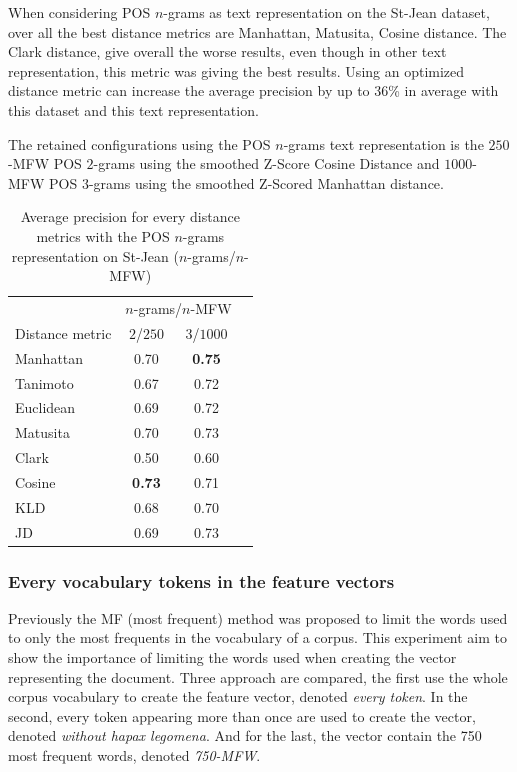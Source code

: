 When considering POS $n$-grams as text representation on the St-Jean dataset, over all the best distance metrics are Manhattan, Matusita, Cosine distance.
The Clark distance, give overall the worse results, even though in other text representation, this metric was giving the best results.
Using an optimized distance metric can increase the average precision by up to $36$\% in average with this dataset and this text representation.

The retained configurations using the POS $n$-grams text representation is the $250$-MFW POS $2$-grams using the smoothed Z-Score Cosine Distance and $1000$-MFW POS $3$-grams using the smoothed Z-Scored Manhattan distance.

\begin{table}
  \centering
  \caption{Average precision for every distance metrics with the POS $n$-grams representation on St-Jean ($n$-grams/$n$-MFW)}
  \label{tab:pos_ngrams}
  \begin{tabular}{l c c c}
    \toprule
                    & \multicolumn{2}{c}{$n$-grams/$n$-MFW} \\
    Distance metric & $2$/$250$ & $3$/$1000$ \\
    \midrule
    Manhattan & 0.70 & \textbf{0.75} \\
    Tanimoto & 0.67 & 0.72 \\
    Euclidean & 0.69 & 0.72 \\
    Matusita & 0.70 & 0.73 \\
    Clark & 0.50 & 0.60 \\
    Cosine & \textbf{0.73} & 0.71 \\
    KLD & 0.68 & 0.70 \\
    JD & 0.69 & 0.73 \\
    \bottomrule
  \end{tabular}
\end{table}

\subsubsection{Every vocabulary tokens in the feature vectors}

Previously the MF (most frequent) method was proposed to limit the words used to only the most frequents in the vocabulary of a corpus.
This experiment aim to show the importance of limiting the words used when creating the vector representing the document.
Three approach are compared, the first use the whole corpus vocabulary to create the feature vector, denoted \textit{every token}.
In the second, every token appearing more than once are used to create the vector, denoted \textit{without hapax legomena}.
And for the last, the vector contain the 750 most frequent words, denoted \textit{750-MFW}.

